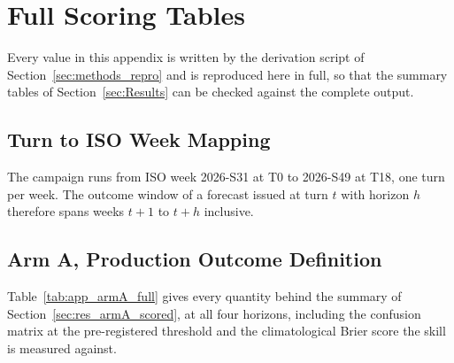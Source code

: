 \section{Full Scoring Tables}
\label{app:calibration}

Every value in this appendix is written by the derivation script of
Section~\ref{sec:methods_repro} and is reproduced here in full, so that the summary tables
of Section~\ref{sec:Results} can be checked against the complete output.

\subsection*{Turn to ISO Week Mapping}

The campaign runs from ISO week 2026-S31 at T0 to 2026-S49 at T18, one turn per week. The
outcome window of a forecast issued at turn $t$ with horizon $h$ therefore spans weeks
$t+1$ to $t+h$ inclusive.

\subsection*{Arm A, Production Outcome Definition}

Table~\ref{tab:app_armA_full} gives every quantity behind the summary of
Section~\ref{sec:res_armA_scored}, at all four horizons, including the confusion matrix at
the pre-registered threshold and the climatological Brier score the skill is measured
against.

